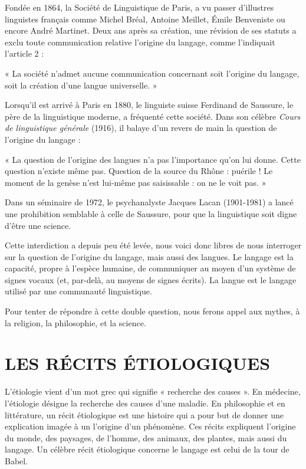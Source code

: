 \endgroup
\clearpage
{}
Fondée en 1864, la Société de Linguistique de Paris, a vu passer d’illustres linguistes français comme Michel Bréal, Antoine Meillet, Émile Benveniste ou encore André Martinet. Deux ans après sa création, une révision de ses statuts a exclu toute communication relative l’origine du langage, comme l’indiquait l’article 2 :

« La société n’admet aucune communication concernant soit l’origine du langage, soit la création d’une langue universelle. »

Lorsqu’il est arrivé à Paris en 1880, le linguiste suisse Ferdinand de Saussure, le père de la linguistique moderne, a fréquenté cette société. Dans son célèbre \textit{Cours de linguistique générale} (1916), il balaye d’un revers de main la question de l’origine du langage :

« La question de l’origine des langues n’a pas l’importance qu’on lui donne. Cette question n’existe même pas. Question de la source du Rhône : puérile ! Le moment de la genèse n’est lui-même pas saisissable : on ne le voit pas. »

Dans un séminaire de 1972, le psychanalyste Jacques Lacan (1901-1981) a lancé une prohibition semblable à celle de Saussure, pour que la linguistique soit digne d’être une science.

Cette interdiction a depuis peu été levée, nous voici donc libres de nous interroger sur la question de l’origine du langage, mais aussi des langues. Le langage est la capacité, propre à l’espèce humaine, de communiquer au moyen d’un système de signes vocaux (et, par-delà, au moyens de signes écrits). La langue est le langage utilisé par une communauté linguistique.

Pour tenter de répondre à cette double question, nous ferons appel aux mythes, à la religion, la philosophie, et la science.

\section{LES RÉCITS ÉTIOLOGIQUES}
L’étiologie vient d’un mot grec qui signifie « recherche des causes ». En médecine, l’étiologie désigne la recherche des causes d’une maladie. En philosophie et en littérature, un récit étiologique est une histoire qui a pour but de donner une explication imagée à un l’origine d’un phénomène. Ces récits expliquent l’origine du monde, des paysages, de l’homme, des animaux, des plantes, mais aussi du langage. Un célèbre récit étiologique concerne le langage est celui de la tour de Babel.

